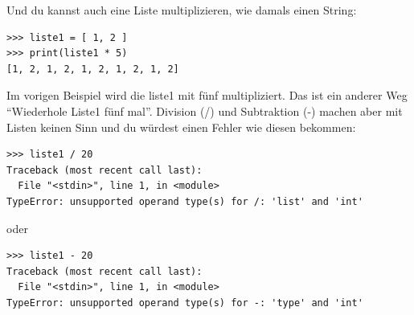 \noindent
Und du kannst auch eine Liste multiplizieren, wie damals einen String:

\begin{Verbatim}[frame=single]
>>> liste1 = [ 1, 2 ]
>>> print(liste1 * 5)
[1, 2, 1, 2, 1, 2, 1, 2, 1, 2]
\end{Verbatim}

\noindent
Im vorigen Beispiel wird die liste1 mit fünf multipliziert. Das ist ein anderer Weg ``Wiederhole Liste1 fünf mal''. Division (/) und Subtraktion (-) machen aber mit Listen keinen Sinn und du würdest einen Fehler wie diesen bekommen:

\begin{Verbatim}[frame=single]
>>> liste1 / 20
Traceback (most recent call last):
  File "<stdin>", line 1, in <module>
TypeError: unsupported operand type(s) for /: 'list' and 'int'
\end{Verbatim}

\noindent
oder

\begin{Verbatim}[frame=single]
>>> liste1 - 20
Traceback (most recent call last):
  File "<stdin>", line 1, in <module>
TypeError: unsupported operand type(s) for -: 'type' and 'int'
\end{Verbatim}

